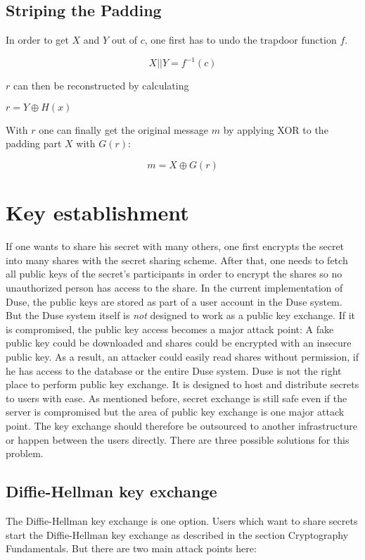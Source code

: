 \subsection{Striping the Padding}

In order to get $X$ and $Y$ out of $c$, one first has to undo the
trapdoor function $f$.

$$X || Y = f^{-1}(c)$$

$r$ can then be reconstructed by calculating

$r = Y \oplus H(x)$

With $r$ one can finally get the original message $m$ by applying XOR
to the padding part $X$ with $G(r)$:

$$m = X \oplus G(r)$$

\section{Key establishment}
\label{sec:key_establishment}

If one wants to share his secret with many others, one first encrypts the
secret into many shares with the secret sharing scheme. After that, one needs
to fetch all public keys of the secret's participants in order to encrypt the
shares so no unauthorized person has access to the share. In the current
implementation of Duse, the public keys are stored as part of a user account
in the Duse system. But the Duse system itself is \textit{not} designed to
work as a public key exchange. If it is compromised, the public key access
becomes a major attack point: A fake public key could be downloaded and shares
could be encrypted with an insecure public key. As a result, an attacker
could easily read shares without permission, if he has access to the database
or the entire Duse system. Duse is not the right place to perform public
key exchange. It is designed to host and distribute secrets to users with ease.
As mentioned before, secret exchange is still safe even if the server is compromised
but the area of public key exchange is one major attack point.
The key exchange should therefore be outsourced to another
infrastructure or happen between the users directly. There are three possible
solutions for this problem.

\subsection{Diffie-Hellman key exchange}

The Diffie-Hellman key exchange is one option. Users which want to share secrets
start the Diffie-Hellman key exchange as described in the section Cryptography
Fundamentals. But there are two main attack points here:

